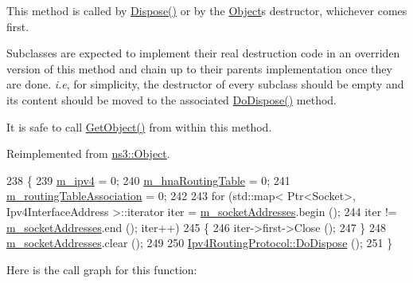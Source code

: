 This method is called by \hyperlink{classns3_1_1Object_aa90ae598863f6c251cdab3c3722afdaf}{Dispose()} or by the \hyperlink{classns3_1_1Object}{Object}\textquotesingle{}s destructor, whichever comes first.

Subclasses are expected to implement their real destruction code in an overriden version of this method and chain up to their parent\textquotesingle{}s implementation once they are done. {\itshape i.\+e}, for simplicity, the destructor of every subclass should be empty and its content should be moved to the associated \hyperlink{classns3_1_1olsr_1_1RoutingProtocol_a4f4847a879139dc41e184b8233573143}{Do\+Dispose()} method.

It is safe to call \hyperlink{classns3_1_1Object_a13e18c00017096c8381eb651d5bd0783}{Get\+Object()} from within this method. 

Reimplemented from \hyperlink{classns3_1_1Object_a475d429a75d302d4775f4ae32479b287}{ns3\+::\+Object}.


\begin{DoxyCode}
238 \{
239   \hyperlink{classns3_1_1olsr_1_1RoutingProtocol_afede79b25ec57e797ff900ae01bca1df}{m\_ipv4} = 0;
240   \hyperlink{classns3_1_1olsr_1_1RoutingProtocol_a398799911ae136e0b247b4bbd608c336}{m\_hnaRoutingTable} = 0;
241   \hyperlink{classns3_1_1olsr_1_1RoutingProtocol_ae631ae3941f563718274166203d3b178}{m\_routingTableAssociation} = 0;
242 
243   \textcolor{keywordflow}{for} (std::map< Ptr<Socket>, Ipv4InterfaceAddress >::iterator iter = 
      \hyperlink{classns3_1_1olsr_1_1RoutingProtocol_ae590f1f394f2ebc0fac434a6866d7c75}{m\_socketAddresses}.begin ();
244        iter != \hyperlink{classns3_1_1olsr_1_1RoutingProtocol_ae590f1f394f2ebc0fac434a6866d7c75}{m\_socketAddresses}.end (); iter++)
245     \{
246       iter->first->Close ();
247     \}
248   \hyperlink{classns3_1_1olsr_1_1RoutingProtocol_ae590f1f394f2ebc0fac434a6866d7c75}{m\_socketAddresses}.clear ();
249 
250   \hyperlink{classns3_1_1Object_a475d429a75d302d4775f4ae32479b287}{Ipv4RoutingProtocol::DoDispose} ();
251 \}
\end{DoxyCode}


Here is the call graph for this function\+:


